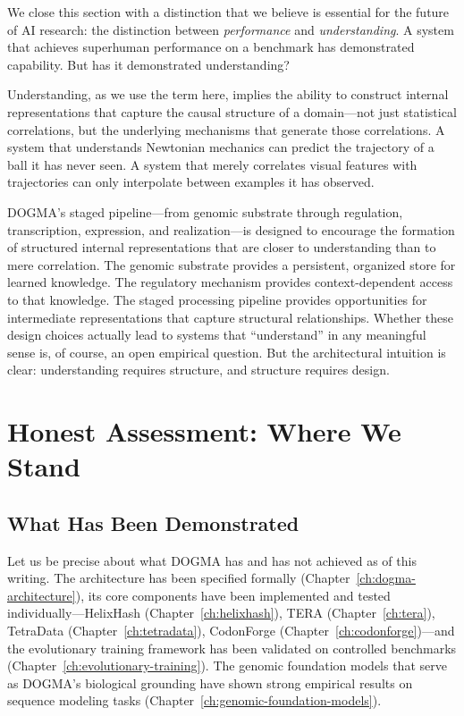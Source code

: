 We close this section with a distinction that we believe is essential for the future of AI research: the distinction between \emph{performance} and \emph{understanding}. A system that achieves superhuman performance on a benchmark has demonstrated capability. But has it demonstrated understanding?

Understanding, as we use the term here, implies the ability to construct internal representations that capture the causal structure of a domain---not just statistical correlations, but the underlying mechanisms that generate those correlations. A system that understands Newtonian mechanics can predict the trajectory of a ball it has never seen. A system that merely correlates visual features with trajectories can only interpolate between examples it has observed.

DOGMA's staged pipeline---from genomic substrate through regulation, transcription, expression, and realization---is designed to encourage the formation of structured internal representations that are closer to understanding than to mere correlation. The genomic substrate provides a persistent, organized store for learned knowledge. The regulatory mechanism provides context-dependent access to that knowledge. The staged processing pipeline provides opportunities for intermediate representations that capture structural relationships. Whether these design choices actually lead to systems that ``understand'' in any meaningful sense is, of course, an open empirical question. But the architectural intuition is clear: understanding requires structure, and structure requires design.

\section{Honest Assessment: Where We Stand}
\label{sec:where-we-stand}

\subsection{What Has Been Demonstrated}

Let us be precise about what DOGMA has and has not achieved as of this writing. The architecture has been specified formally (Chapter~\ref{ch:dogma-architecture}), its core components have been implemented and tested individually---HelixHash (Chapter~\ref{ch:helixhash}), TERA (Chapter~\ref{ch:tera}), TetraData (Chapter~\ref{ch:tetradata}), CodonForge (Chapter~\ref{ch:codonforge})---and the evolutionary training framework has been validated on controlled benchmarks (Chapter~\ref{ch:evolutionary-training}). The genomic foundation models that serve as DOGMA's biological grounding have shown strong empirical results on sequence modeling tasks (Chapter~\ref{ch:genomic-foundation-models}).

